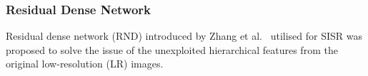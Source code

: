 \subsubsection{Residual Dense Network}
Residual dense network (RND) introduced by Zhang et al.~\cite{Zhang2018} utilised for SISR was proposed to solve the issue of the unexploited hierarchical features from the original low-resolution (LR) images.